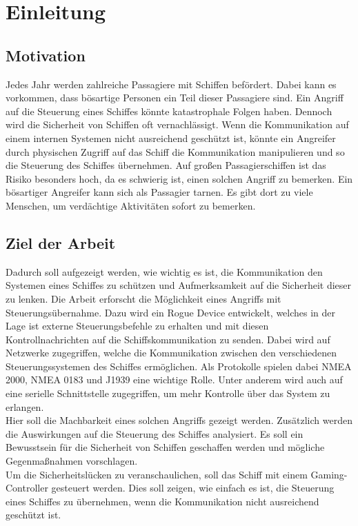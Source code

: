\chapter{Einleitung}

\section{Motivation}
Jedes Jahr werden zahlreiche Passagiere mit Schiffen befördert. Dabei kann es vorkommen, dass bösartige Personen ein Teil dieser Passagiere sind.
Ein Angriff auf die Steuerung eines Schiffes könnte katastrophale Folgen haben. Dennoch wird die Sicherheit von Schiffen oft vernachlässigt.
Wenn die Kommunikation auf einem internen Systemen nicht ausreichend geschützt ist, könnte ein Angreifer durch physischen Zugriff auf das Schiff die 
Kommunikation manipulieren und so die Steuerung des Schiffes übernehmen. Auf großen Passagierschiffen ist das Risiko besonders hoch, da es
schwierig ist, einen solchen Angriff zu bemerken. Ein bösartiger Angreifer kann sich als Passagier tarnen. Es gibt dort
zu viele Menschen, um verdächtige Aktivitäten sofort zu bemerken. \\

\section{Ziel der Arbeit}
Dadurch soll aufgezeigt werden, wie wichtig es ist, die Kommunikation den Systemen eines Schiffes zu schützen
und Aufmerksamkeit auf die Sicherheit dieser zu lenken.
Die Arbeit erforscht die Möglichkeit eines Angriffs mit Steuerungsübernahme. Dazu wird ein Rogue Device entwickelt, 
welches in der 
Lage ist externe Steuerungsbefehle zu erhalten und mit diesen Kontrollnachrichten auf die Schiffskommunikation zu senden.
Dabei wird auf Netzwerke zugegriffen, welche die Kommunikation zwischen den verschiedenen Steuerungssystemen des Schiffes 
ermöglichen. Als Protokolle spielen dabei NMEA 2000, NMEA 0183 und J1939 eine wichtige Rolle. Unter anderem wird auch 
auf eine serielle Schnittstelle zugegriffen, um mehr Kontrolle über das System zu erlangen. \\
Hier soll die Machbarkeit eines solchen Angriffs gezeigt werden. Zusätzlich werden die Auswirkungen auf die Steuerung des 
Schiffes analysiert. Es soll ein Bewusstsein für die Sicherheit von Schiffen geschaffen werden und mögliche Gegenmaßnahmen
vorschlagen.\\
Um die Sicherheitslücken zu veranschaulichen, soll das Schiff mit einem Gaming-Controller gesteuert werden.
Dies soll zeigen, wie einfach es ist, die Steuerung eines Schiffes zu übernehmen, wenn die Kommunikation nicht 
ausreichend geschützt ist.\\
